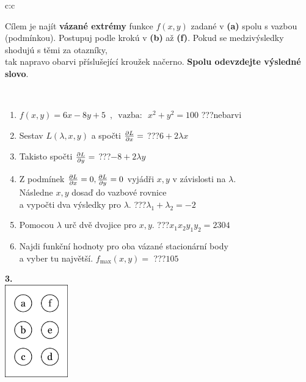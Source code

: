 \documentclass[10pt]{report}
\begin{document}
\begin{tabular}{c:c}
\begin{minipage}[c][104.5mm][t]{0.5\linewidth}
\begin{center}
\begin{minipage}{0.95\linewidth}
\begin{center}
Cílem je najít \textbf{vázané extrémy} funkce $f(x,y)$ zadané v \textbf{(a)} spolu s vazbou (podmínkou). Postupuj podle krokú v \textbf{(b)} až \textbf{(f)}. Pokud se medzivýsledky shodujú s těmi za otazníky,\\tak napravo obarvi příslušející kroužek načerno. \textbf{Spolu odevzdejte výsledné slovo}.
\end{center}
\end{minipage}
\\[1mm]
\begin{minipage}{0.79\linewidth}
\begin{center}
\begin{varwidth}{\linewidth}
\begin{enumerate}
\normalsize
\item $f(x,y)=6x-8y+5 \enspace , \enspace \mathrm{vazba:} \enspace x^2+y^2=100$\quad \dotfill\; ???\;\dotfill \quad nebarvi
\item Sestav $L(\lambda,x,y)$ a spočti $\pdv{L}{x}=$\quad \dotfill\; ???\;\dotfill \quad $6+2\lambda x$
\item Takisto spočti $\pdv{L}{y}=$\quad \dotfill\; ???\;\dotfill \quad $-8+2\lambda y$
\item Z podmínek $\pdv{L}{x}=0 , \pdv{L}{y}=0$ vyjádři $x,y$ v závislosti na $\lambda$.\\ \phantom{xxxxxx}Následne $x,y$ dosaď do vazbové rovnice\\ \phantom{xxxxxx}a vypočti dva výsledky pro $\lambda$.\quad \dotfill\; ???\;\dotfill \quad $\lambda_1+\lambda_2=-2$
\item Pomocou $\lambda$ urč dvě dvojice pro $x,y$.\quad \dotfill\; ???\;\dotfill \quad $x_1 x_2 y_1 y_2=2304$
\item Najdi funkční hodnoty pro oba vázané stacionární body\\ \phantom{xxxxxx}a vyber tu najvětší. $f_{\text{max}}(x,y)=$\quad \dotfill\; ???\;\dotfill \quad $105$
\end{enumerate}
\end{varwidth}
\end{center}
\end{minipage}
\begin{minipage}{0.20\linewidth}
\begin{center}
{\Huge\bfseries 3.} \\[2mm]
\includegraphics[height=40mm]{../images/braille.png}

\end{center}
\end{minipage}
\end{center}
\end{minipage}
\end{tabular}
\end{document}
